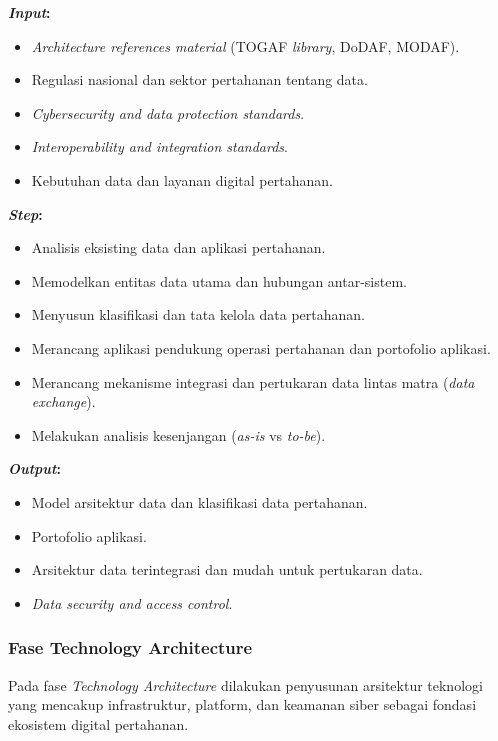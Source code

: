 \textbf{\textit{Input}:}
\begin{itemize}
  \item \textit{Architecture references material} (TOGAF \textit{library}, DoDAF, MODAF).
  \item Regulasi nasional dan sektor pertahanan tentang data.
  \item \textit{Cybersecurity and data protection standards}.
  \item \textit{Interoperability and integration standards}.
  \item Kebutuhan data dan layanan digital pertahanan.
\end{itemize}
\textbf{\textit{Step}:}
\begin{itemize}
  \item Analisis eksisting data dan aplikasi pertahanan.
  \item Memodelkan entitas data utama dan hubungan antar-sistem.
  \item Menyusun klasifikasi dan tata kelola data pertahanan.
  \item Merancang aplikasi pendukung operasi pertahanan dan portofolio aplikasi.
  \item Merancang mekanisme integrasi dan pertukaran data lintas matra (\textit{data exchange}).
  \item Melakukan analisis kesenjangan (\textit{as-is} vs \textit{to-be}).
\end{itemize}
\textbf{\textit{Output}:}
\begin{itemize}
  \item Model arsitektur data dan klasifikasi data pertahanan.
  \item Portofolio aplikasi.
  \item Arsitektur data terintegrasi dan mudah untuk pertukaran data.
  \item \textit{Data security and access control}.
\end{itemize}

\subsubsection{Fase Technology Architecture}
Pada fase \textit{Technology Architecture} dilakukan penyusunan arsitektur teknologi yang mencakup infrastruktur, platform, dan keamanan siber sebagai fondasi ekosistem digital pertahanan.

